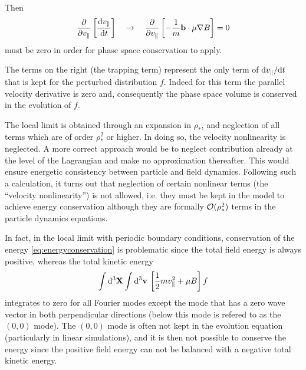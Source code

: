 Then 
\begin{equation} 
\frac{\partial }{\partial  v_\parallel } \left [ \frac{\mathrm{d} v_\parallel}{\mathrm{d} t} \right ] \quad \rightarrow \quad 
\frac{\partial }{\partial  v_\parallel } \left [ - \frac{1 }{ m} {\bf b} \cdot \mu \nabla B \right ] = 0 
\end{equation}
must be zero in order for phase space conservation to apply. 


The terms on the right (the trapping term) represent the only term of ${\rm d} v_\parallel / {\rm d} t$ that is kept for the perturbed distribution $f$. 
Indeed for this term the parallel velocity derivative is zero and, consequently the phase space volume is conserved in the evolution of $f$. 

The local limit is obtained through an expansion in $\rho_*$, and neglection of all terms which are of order $\rho_*^2$ or higher. In doing so, the velocity nonlinearity is neglected.
A more correct approach 
would be to neglect contribution already at the level of the Lagrangian and make no approximation thereafter. This would ensure energetic consistency between particle and field dynamics.
Following such a calculation, it turns out that neglection of certain nonlinear terms (the ``velocity nonlinearity'') is not allowed, i.e. they must be kept in the model to achieve energy conservation although they are formally $\mathcal{O} (\rho_*^2)$ terms in the particle dynamics equations.

In fact, in the local limit with periodic boundary conditions,
conservation of the energy \eqref{eq:energyconservation} is
problematic since the total field energy is always positive, whereas
the total kinetic energy
\begin{equation} 
\int {\rm d}^3 {\bf X} \int {\rm d}^3 {\bf v} \, \left [ \frac{1 }{ 2} mv_\parallel^2 + \mu B \right ] f 
\end{equation} 
integrates to zero for all Fourier modes except the mode that has a zero wave vector in both perpendicular directions (below this mode is refered to as the $(0,0)$ mode). 
The $(0,0)$ mode is often not kept in the evolution equation (particularly in linear
 simulations), and it is then not possible to conserve the energy since the positive 
field energy can not be balanced with a 
negative total kinetic energy. 

